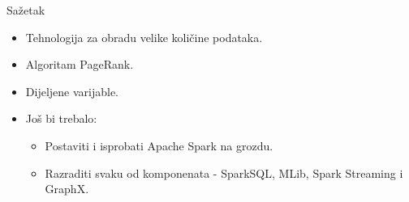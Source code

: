 \documentclass{beamer}
\begin{document}
\begin{frame}{Sažetak}
  \begin{itemize}
  \item
    Tehnologija za obradu velike količine podataka.
  \item
    Algoritam PageRank.
  \item
    Dijeljene varijable.
  \end{itemize}
  
  \begin{itemize}
  \item
    Još bi trebalo: 
    \begin{itemize}
    \item
      Postaviti i isprobati Apache Spark na grozdu.
    \item
      Razraditi svaku od komponenata - SparkSQL, MLib, Spark Streaming i GraphX.
    \end{itemize}
  \end{itemize}
\end{frame}
\end{document}
